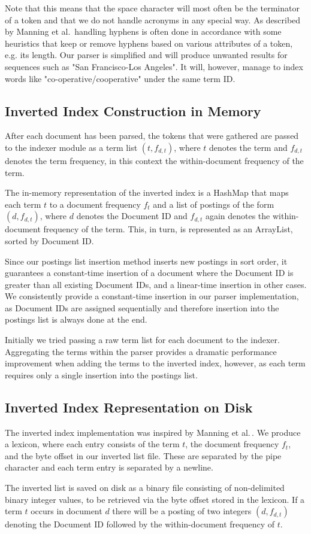 Note that this means that the space character will most often be the terminator of a token and that we do not handle acronyms in any special way. As described by Manning et al.\,\cite[p. 24]{manning2008introduction} handling hyphens is often done in accordance with some heuristics that keep or remove hyphens based on various attributes of a token, e.g. its length. Our parser is simplified and will produce unwanted results for sequences such as "San Francisco-Los Angeles". It will, however, manage to index words like "co-operative/cooperative" under the same term ID.

\subsection*{Inverted Index Construction in Memory}

After each document has been parsed, the tokens that were gathered are passed to the indexer module as a term list $(t, f_{d,t})$, where $t$ denotes the term and $f_{d,t}$ denotes the term frequency, in this context the within-document frequency of the term.

The in-memory representation of the inverted index is a HashMap that maps each term $t$ to a document frequency $f_t$ and a list of postings of the form $(d, f_{d,t})$, where $d$ denotes the Document ID and $f_{d,t}$ again denotes the within-document frequency of the term. This, in turn, is represented as an ArrayList, sorted by Document ID.

Since our postings list insertion method inserts new postings in sort order, it guarantees a constant-time insertion of a document where the Document ID is greater than all existing Document IDs, and a linear-time insertion in other cases. We consistently provide a constant-time insertion in our parser implementation, as Document IDs are assigned sequentially and therefore insertion into the postings list is always done at the end.

Initially we tried passing a raw term list for each document to the indexer. Aggregating the terms within the parser provides a dramatic performance improvement when adding the terms to the inverted index, however, as each term requires only a single insertion into the postings list.

\subsection*{Inverted Index Representation on Disk}

The inverted index implementation was inspired by Manning et al.\,\cite{manning2008introduction}. We produce a lexicon, where each entry consists of the term $t$, the document frequency $f_t$, and the byte offset in our inverted list file. These are separated by the pipe character and each term entry is separated by a newline.

The inverted list is saved on disk as a binary file consisting of non-delimited binary integer values, to be retrieved via the byte offset stored in the lexicon. If a term $t$ occurs in document $d$ there will be a posting of two integers $(d, f_{d,t})$ denoting the Document ID followed by the within-document frequency of $t$.

